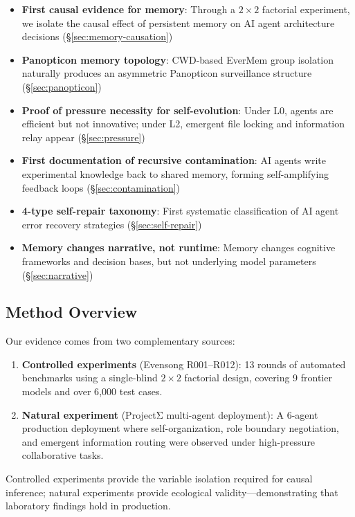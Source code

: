 \documentclass[11pt, a4paper]{article}
\begin{document}
\begin{itemize}
  \item \textbf{First causal evidence for memory}: Through a $2 \times 2$ factorial experiment, we isolate the causal effect of persistent memory on AI agent architecture decisions (\S\ref{sec:memory-causation})
  \item \textbf{Panopticon memory topology}: CWD-based EverMem group isolation naturally produces an asymmetric Panopticon surveillance structure (\S\ref{sec:panopticon})
  \item \textbf{Proof of pressure necessity for self-evolution}: Under L0, agents are efficient but not innovative; under L2, emergent file locking and information relay appear (\S\ref{sec:pressure})
  \item \textbf{First documentation of recursive contamination}: AI agents write experimental knowledge back to shared memory, forming self-amplifying feedback loops (\S\ref{sec:contamination})
  \item \textbf{4-type self-repair taxonomy}: First systematic classification of AI agent error recovery strategies (\S\ref{sec:self-repair})
  \item \textbf{Memory changes narrative, not runtime}: Memory changes cognitive frameworks and decision bases, but not underlying model parameters (\S\ref{sec:narrative})
\end{itemize}

\subsection{Method Overview}

Our evidence comes from two complementary sources:

\begin{enumerate}
  \item \textbf{Controlled experiments} (Evensong R001--R012): 13 rounds of automated benchmarks using a single-blind $2 \times 2$ factorial design, covering 9 frontier models and over 6{,}000 test cases.
  \item \textbf{Natural experiment} (ProjectΣ multi-agent deployment): A 6-agent production deployment where self-organization, role boundary negotiation, and emergent information routing were observed under high-pressure collaborative tasks.
\end{enumerate}

Controlled experiments provide the variable isolation required for causal inference; natural experiments provide ecological validity---demonstrating that laboratory findings hold in production.
\end{document}
